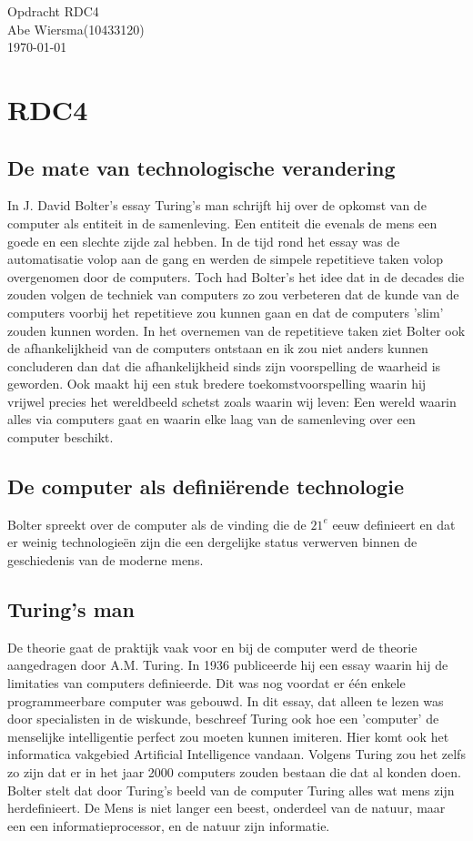 \documentclass[pdftex,12pt,a4paper]{article}
\begin{document}

\noindent Opdracht RDC4\\ 
Abe Wiersma(10433120)\\
\today
\section*{RDC4}
\subsection{De mate van technologische verandering}
In J. David Bolter's essay Turing's man schrijft hij over de opkomst van de computer als entiteit in de samenleving. Een entiteit die evenals de mens een goede en een slechte zijde zal hebben. In de tijd rond het essay was de automatisatie volop aan de gang en werden de simpele repetitieve taken volop overgenomen door de computers. Toch had Bolter's het idee dat in de decades die zouden volgen de techniek van computers zo zou verbeteren dat de kunde van de computers voorbij het repetitieve zou kunnen gaan en dat de computers 'slim' zouden kunnen worden. In het overnemen van de repetitieve taken ziet Bolter ook de afhankelijkheid van de computers ontstaan en ik zou niet anders kunnen concluderen dan dat die afhankelijkheid sinds zijn voorspelling de waarheid is geworden. Ook maakt hij een stuk bredere toekomstvoorspelling waarin hij vrijwel precies het wereldbeeld schetst zoals waarin wij leven: Een wereld waarin alles via computers gaat en waarin elke laag van de samenleving over een computer beschikt.
\subsection{De computer als definiërende technologie}
Bolter spreekt over de computer als de vinding die de $21^{e}$ eeuw definieert en dat er weinig technologieën zijn die een dergelijke status verwerven binnen de geschiedenis van de moderne mens.

\subsection{Turing's man}
De theorie gaat de praktijk vaak voor en bij de computer werd de theorie aangedragen door A.M. Turing. In 1936 publiceerde hij een essay waarin hij de limitaties van computers definieerde. Dit was nog voordat er één enkele programmeerbare computer was gebouwd. In dit essay, dat alleen te lezen was door specialisten in de wiskunde, beschreef Turing ook hoe een 'computer' de menselijke intelligentie perfect zou moeten kunnen imiteren. Hier komt ook het informatica vakgebied Artificial Intelligence vandaan. Volgens Turing zou het zelfs zo zijn dat er in het jaar 2000 computers zouden bestaan die dat al konden doen.
Bolter stelt dat door Turing's beeld van de computer Turing alles wat mens zijn herdefinieert. De Mens is niet langer een beest, onderdeel van de natuur, maar een een informatieprocessor, en de natuur zijn informatie. 
\end{document}
